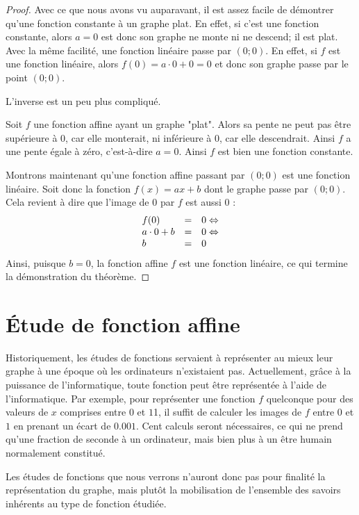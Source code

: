 \begin{proof}
Avec ce que nous avons vu auparavant, il est assez facile de démontrer qu'une fonction constante à un graphe plat. En effet, si c'est une fonction constante, alors $a=0$ est donc son graphe ne monte ni ne descend; il est plat. Avec la même facilité, une fonction linéaire passe par $(0;0)$. En effet, si $f$ est une fonction linéaire, alors $f(0) = a\cdot 0 + 0 = 0$ et donc son graphe passe par le point $(0;0)$.

L'inverse est un peu plus compliqué.

Soit $f$ une fonction affine ayant un graphe "plat". Alors sa pente ne peut pas être supérieure à $0$, car elle monterait, ni inférieure à $0$, car elle descendrait. Ainsi $f$ a une pente égale à zéro, c'est-à-dire $a=0$. Ainsi $f$ est bien une fonction constante.

Montrons maintenant qu'une fonction affine passant par $(0;0)$ est une fonction linéaire. Soit donc la fonction $f(x) = ax +b$ dont le graphe passe par $(0;0)$. Cela revient à dire que l'image de $0$ par $f$ est aussi $0$ :
$$
\begin{array}{lcl}
f(0) &=& 0 \Leftrightarrow\\
a\cdot 0 + b &=& 0 \Leftrightarrow\\
b &=& 0
\end{array}
$$
Ainsi, puisque $b=0$, la fonction affine $f$ est une fonction linéaire, ce qui termine la démonstration du théorème.
\end{proof}

\section{\'Etude de fonction affine}\label{affine}

Historiquement, les études de fonctions servaient à représenter au mieux leur graphe à une époque où les ordinateurs n'existaient pas. Actuellement, grâce à la puissance de l'informatique, toute fonction peut être représentée à l'aide de l'informatique. Par exemple, pour représenter une fonction $f$ quelconque pour des valeurs de $x$ comprises entre $0$ et $1$1, il suffit de calculer les images de $f$ entre $0$ et $1$ en prenant un écart de $0.001$. Cent calculs seront nécessaires, ce qui ne prend qu'une fraction de seconde à un ordinateur, mais bien plus à un être humain normalement constitué.

Les études de fonctions que nous verrons n'auront donc pas pour finalité la représentation du graphe, mais plutôt la mobilisation de l'ensemble des savoirs inhérents au type de fonction étudiée.


